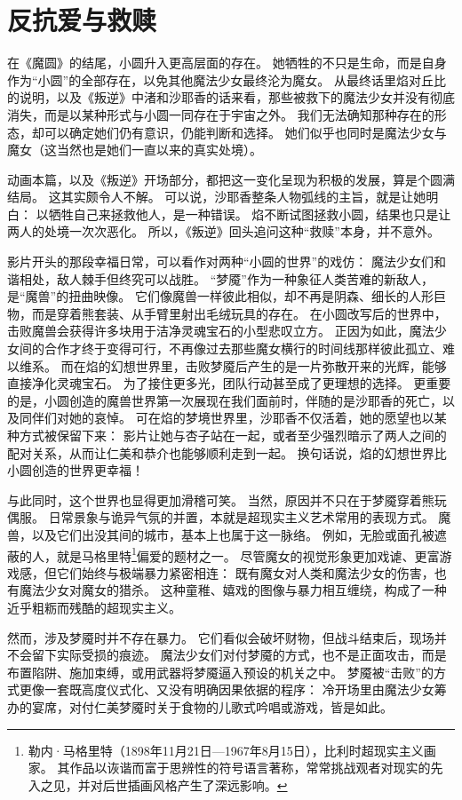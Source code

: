 \chapter{反抗爱与救赎}
在《魔圆》的结尾，小圆升入更高层面的存在。
她牺牲的不只是生命，而是自身作为“小圆”的全部存在，以免其他魔法少女最终沦为魔女。
从最终话里焰对丘比的说明，以及《叛逆》中渚和沙耶香的话来看，那些被救下的魔法少女并没有彻底消失，而是以某种形式与小圆一同存在于宇宙之外。
我们无法确知那种存在的形态，却可以确定她们仍有意识，仍能判断和选择。
她们似乎也同时是魔法少女与魔女（这当然也是她们一直以来的真实处境）。

动画本篇，以及《叛逆》开场部分，都把这一变化呈现为积极的发展，算是个圆满结局。
这其实颇令人不解。
可以说，沙耶香整条人物弧线的主旨，就是让她明白：
以牺牲自己来拯救他人，是一种错误。
焰不断试图拯救小圆，结果也只是让两人的处境一次次恶化。
所以，《叛逆》回头追问这种“救赎”本身，并不意外。

影片开头的那段幸福日常，可以看作对两种“小圆的世界”的戏仿：
魔法少女们和谐相处，敌人棘手但终究可以战胜。
“梦魇”作为一种象征人类苦难的新敌人，是“魔兽”的扭曲映像。
它们像魔兽一样彼此相似，却不再是阴森、细长的人形巨物，而是穿着熊套装、从手臂里射出毛绒玩具的存在。
在小圆改写后的世界中，击败魔兽会获得许多块用于洁净灵魂宝石的小型悲叹立方。
正因为如此，魔法少女间的合作才终于变得可行，不再像过去那些魔女横行的时间线那样彼此孤立、难以维系。
而在焰的幻想世界里，击败梦魇后产生的是一片弥散开来的光辉，能够直接净化灵魂宝石。
为了接住更多光，团队行动甚至成了更理想的选择。
更重要的是，小圆创造的魔兽世界第一次展现在我们面前时，伴随的是沙耶香的死亡，以及同伴们对她的哀悼。
可在焰的梦境世界里，沙耶香不仅活着，她的愿望也以某种方式被保留下来：
影片让她与杏子站在一起，或者至少强烈暗示了两人之间的配对关系，从而让仁美和恭介也能够顺利走到一起。
换句话说，焰的幻想世界比小圆创造的世界更幸福！

与此同时，这个世界也显得更加滑稽可笑。
当然，原因并不只在于梦魇穿着熊玩偶服。
日常景象与诡异气氛的并置，本就是超现实主义艺术常用的表现方式。
魔兽，以及它们出没其间的城市，基本上也属于这一脉络。
例如，无脸或面孔被遮蔽的人，就是马格里特\footnote{%
    勒内·马格里特（1898年11月21日—1967年8月15日），比利时超现实主义画家。
    其作品以诙谐而富于思辨性的符号语言著称，常常挑战观者对现实的先入之见，并对后世插画风格产生了深远影响。
}偏爱的题材之一\cite{gohr2009magritte}。
尽管魔女的视觉形象更加戏谑、更富游戏感，但它们始终与极端暴力紧密相连：
既有魔女对人类和魔法少女的伤害，也有魔法少女对魔女的猎杀。
这种童稚、嬉戏的图像与暴力相互缠绕，构成了一种近乎粗粝而残酷的超现实主义。

然而，涉及梦魇时并不存在暴力。
它们看似会破坏财物，但战斗结束后，现场并不会留下实际受损的痕迹。
魔法少女们对付梦魇的方式，也不是正面攻击，而是布置陷阱、施加束缚，或用武器将梦魇逼入预设的机关之中。
梦魇被“击败”的方式更像一套既高度仪式化、又没有明确因果依据的程序：
冷开场里由魔法少女筹办的宴席，对付仁美梦魇时关于食物的儿歌式吟唱或游戏，皆是如此。

